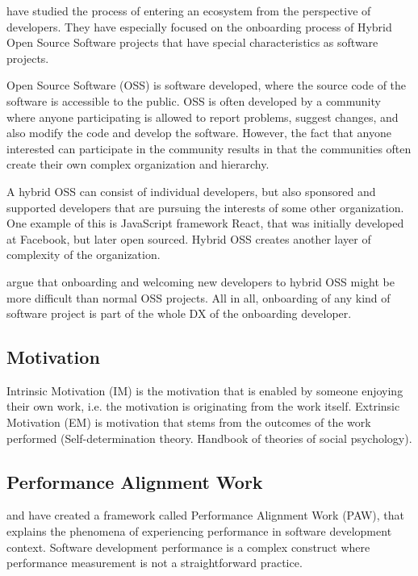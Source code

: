 \documentclass[english, 12pt, a4paper, sci, utf8, a-1b, online]{aaltothesis}
\begin{document}
\textcite{entering-an-ecosystem} have studied the process of entering an ecosystem from the perspective of developers. They have especially focused on the onboarding process of Hybrid Open Source Software projects that have special characteristics as software projects.

Open Source Software (OSS) is software developed, where the source code of the software is accessible to the public. OSS is often developed by a community where anyone participating is allowed to report problems, suggest changes, and also modify the code and develop the software. However, the fact that anyone interested can participate in the community results in that the communities often create their own complex organization and hierarchy.

A hybrid OSS can consist of individual developers, but also sponsored and supported developers that are pursuing the interests of some other organization. One example of this is JavaScript framework React, that was initially developed at Facebook, but later open sourced. Hybrid OSS creates another layer of complexity of the organization.

\textcite{entering-an-ecosystem} argue that onboarding and welcoming new developers to hybrid OSS might be more difficult than normal OSS projects. All in all, onboarding of any kind of software project is part of the whole DX of the onboarding developer.

\subsection{Motivation}

Intrinsic Motivation (IM) is the motivation that is enabled by someone enjoying their own work, i.e. the motivation is originating from the work itself. Extrinsic Motivation (EM) is motivation that stems from the outcomes of the work performed \parencite{flow-intrinsic-dx} (Self-determination theory. Handbook of theories of social psychology).

\subsection{Performance Alignment Work}

\textcite{how-developers-experience-team-performance} and \textcite{paw} have created a framework called Performance Alignment Work (PAW), that explains the phenomena of experiencing performance in software development context. Software development performance is a complex construct where performance measurement is not a straightforward practice.
\end{document}
